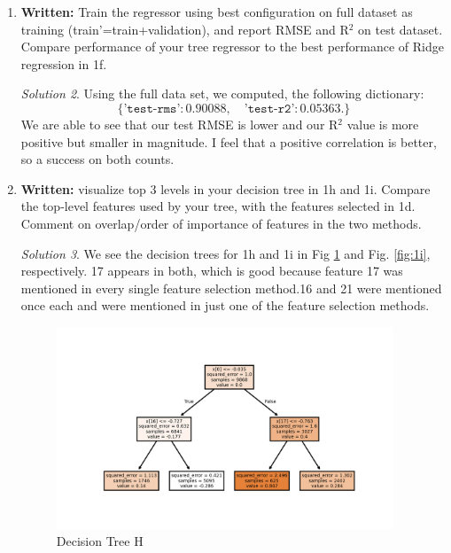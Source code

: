 \documentclass[a4paper,12pt]{article}
\theoremstyle{definition}
\theoremstyle{remark}
\newtheorem*{solution}{Solution}
\begin{document}
\begin{enumerate}
\begin{enumerate}
\begin{solution}
			
			\end{solution}
			\item {\bf Written:} Train the regressor using best configuration on full dataset as training (train’=train+validation), and report RMSE and R$^2$ on test dataset. Compare performance of your tree regressor to the best performance of Ridge regression in 1f.
			\begin{solution}
				Using the full data set, we computed, the following dictionary:
				\[\{\texttt{'test-rms'}: 0.90088, \quad \texttt{'test-r2'}: 0.05363.\}\]
				We are able to see that our test RMSE is lower and our R$^2$ value is more positive but smaller in magnitude. I feel that a positive correlation is better, so a success on both counts.
			\end{solution}
			\item {\bf Written:} visualize top 3 levels in your decision tree in 1h and 1i. Compare the top-level features used by your
			tree, with the features selected in 1d. Comment on overlap/order of importance of features in the two methods.
			\begin{solution}
				We see the decision trees for 1h and 1i in Fig \ref{fig:1h} and Fig. \ref{fig:1i}, respectively. 17 appears in both, which is good because feature 17 was mentioned in every single feature selection method.16 and 21 were mentioned once each and were mentioned in just one of the feature selection methods.
				\begin{figure}
				\centering
				\begin{minipage}{0.49\textwidth}
					\centering
					\includegraphics[width=0.95\textwidth]{../decision_tree_h}
					\caption{Decision Tree H}
					\label{fig:1h}
				\end{minipage}\hfill
				\begin{minipage}{0.49\textwidth}

\end{minipage}
\end{figure}
\end{solution}
\end{enumerate}
\end{enumerate}
\end{document}
